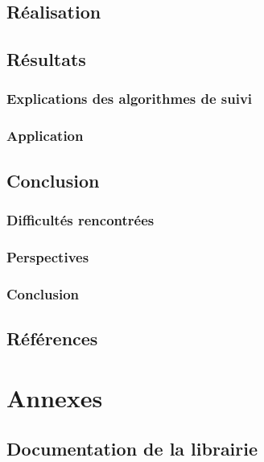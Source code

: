 \documentclass{report}
\begin{document}
	\chapter{Réalisation}
	
	\chapter{Résultats}
		\section{Explications des algorithmes de suivi}
		\section{Application}
	
	\chapter{Conclusion}
		\section{Difficultés rencontrées}
		\section{Perspectives}
		\section{Conclusion}
	
	\chapter{Références}
	 
	
	
	\part{Annexes}
	\appendix
		\chapter{Documentation de la librairie}	
\end{document}
